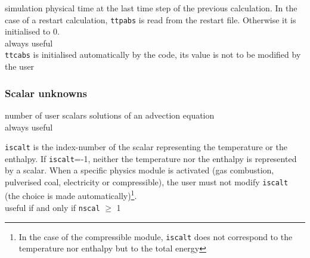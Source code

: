 {simulation physical time at the last time step of the previous
calculation. In the case of a restart calculation, {\tt ttpabs} is read from
the restart file. Otherwise it is initialised to 0.\\
always useful\\
{\tt ttcabs} is initialised automatically by the code, its value is not to
be modified by the user}

\subsubsection{Scalar unknowns}

{number of user scalars solutions of an advection equation\\
always useful}

{{\tt iscalt} is the index-number of the scalar
representing the temperature or the enthalpy. If {\tt iscalt}=-1, neither
the temperature nor the enthalpy is represented by a scalar. When a specific
physics module is activated (gas combustion, pulverised coal,
electricity or compressible),
the user must not modify {\tt iscalt} (the choice is made
automatically)\footnote{In the case of the compressible module, {\tt iscalt}
does not correspond to the temperature nor enthalpy but to the total energy}.\\
useful if and only if {\tt nscal} $\geqslant$ 1}

